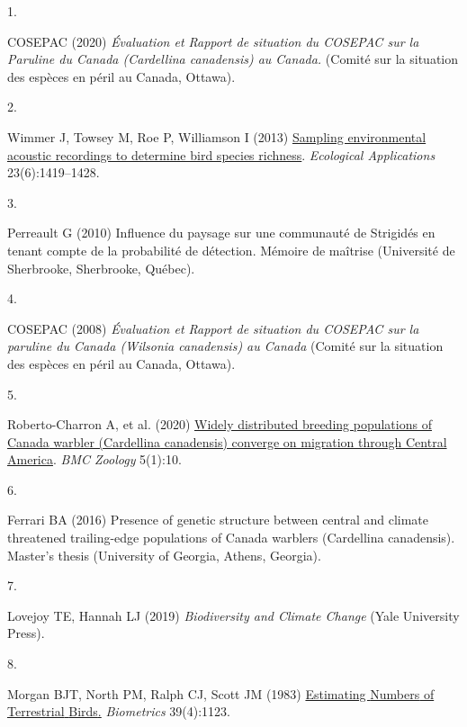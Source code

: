 \documentclass[9pt,twocolumn,twoside,]{pnas-new}
\newlength{\cslhangindent}
\newlength{\csllabelwidth}
\newlength{\cslentryspacingunit} %
\newenvironment{CSLReferences}[2] %
 {%
  \setlength{\parindent}{0pt}
  \ifodd #1
  \let\oldpar\par
  \def\par{\hangindent=\cslhangindent\oldpar}
  \fi
  \setlength{\parskip}{#2\cslentryspacingunit}
 }%
 {}
\newcommand{\CSLLeftMargin}[1]{\parbox[t]{\csllabelwidth}{#1}}
\newcommand{\CSLRightInline}[1]{\parbox[t]{\linewidth - \csllabelwidth}{#1}\break}
\begin{document}
\hypertarget{refs}{}
\begin{CSLReferences}{0}{0}
\leavevmode{}%
\CSLLeftMargin{1. }%
\CSLRightInline{COSEPAC (2020) \emph{Évaluation et {Rapport} de
situation du {COSEPAC} sur la {Paruline} du {Canada} ({Cardellina}
canadensis) au {Canada}.} (Comité sur la situation des espèces en péril
au Canada, Ottawa).}

\leavevmode{}%
\CSLLeftMargin{2. }%
\CSLRightInline{Wimmer J, Towsey M, Roe P, Williamson I (2013)
\href{https://doi.org/10.1890/12-2088.1}{Sampling environmental acoustic
recordings to determine bird species richness}. \emph{Ecological
Applications} 23(6):1419--1428.}

\leavevmode{}%
\CSLLeftMargin{3. }%
\CSLRightInline{Perreault G (2010) Influence du paysage sur une
communauté de {Strigidés} en tenant compte de la probabilité de
détection. Mémoire de maîtrise (Université de Sherbrooke, Sherbrooke,
Québec).}

\leavevmode{}%
\CSLLeftMargin{4. }%
\CSLRightInline{COSEPAC (2008) \emph{Évaluation et {Rapport} de
situation du {COSEPAC} sur la paruline du {Canada} ({Wilsonia}
canadensis) au {Canada}} (Comité sur la situation des espèces en péril
au Canada, Ottawa).}

\leavevmode{}%
\CSLLeftMargin{5. }%
\CSLRightInline{Roberto-Charron A, et al. (2020)
\href{https://doi.org/10.1186/s40850-020-00056-4}{Widely distributed
breeding populations of {Canada} warbler ({Cardellina} canadensis)
converge on migration through {Central} {America}}. \emph{BMC Zoology}
5(1):10.}

\leavevmode{}%
\CSLLeftMargin{6. }%
\CSLRightInline{Ferrari BA (2016) Presence of genetic structure between
central and climate threatened trailing-edge populations of {Canada}
warblers ({Cardellina} canadensis). Master's thesis (University of
Georgia, Athens, Georgia).}

\leavevmode{}%
\CSLLeftMargin{7. }%
\CSLRightInline{Lovejoy TE, Hannah LJ (2019) \emph{Biodiversity and
{Climate} {Change}} (Yale University Press).}

\leavevmode{}%
\CSLLeftMargin{8. }%
\CSLRightInline{Morgan BJT, North PM, Ralph CJ, Scott JM (1983)
\href{https://doi.org/10.2307/2531357}{Estimating {Numbers} of
{Terrestrial} {Birds}.} \emph{Biometrics} 39(4):1123.}

\end{CSLReferences}



% 
\end{document}
